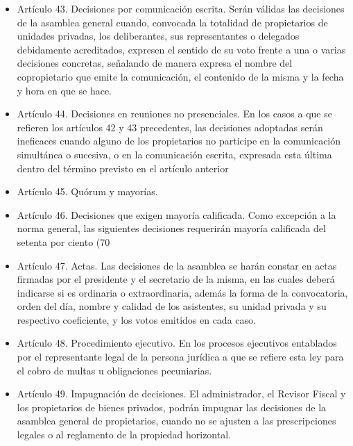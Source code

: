 \begin{itemize}
\begin{itemize}
\item Artículo 43. Decisiones por comunicación escrita. Serán válidas las decisiones de la asamblea general cuando, convocada la totalidad de propietarios de unidades privadas, los deliberantes, sus representantes o delegados debidamente acreditados, expresen el sentido de su voto frente a una o varias decisiones concretas, señalando de manera expresa el nombre del copropietario que emite la comunicación, el contenido de la misma y la fecha y hora en que se hace. 

\item Artículo 44. Decisiones en reuniones no presenciales. En los casos a que se refieren los artículos 42 y 43 precedentes, las decisiones adoptadas serán ineficaces cuando alguno de los propietarios no participe en la comunicación simultánea o sucesiva, o en la comunicación escrita, expresada esta última dentro del término previsto en el artículo anterior

\item Artículo 45. Quórum y mayorías. 

\item Artículo 46. Decisiones que exigen mayoría calificada. Como excepción a la norma general, las siguientes decisiones requerirán mayoría calificada del setenta por ciento (70%

\item Artículo 47. Actas. Las decisiones de la asamblea se harán constar en actas firmadas por el presidente y el secretario de la misma, en las cuales deberá indicarse si es ordinaria o extraordinaria, además la forma de la convocatoria, orden del día, nombre y calidad de los asistentes, su unidad privada y su respectivo coeficiente, y los votos emitidos en cada caso. 

\item Artículo 48. Procedimiento ejecutivo. En los procesos ejecutivos entablados por el representante legal de la persona jurídica a que se refiere esta ley para el cobro de multas u obligaciones pecuniarias.

\item Artículo 49. Impugnación de decisiones. El administrador, el Revisor Fiscal y los propietarios de bienes privados, podrán impugnar las decisiones de la asamblea general de propietarios, cuando no se ajusten a las prescripciones legales o al reglamento de la propiedad horizontal.
\end{itemize}
\end{itemize}

